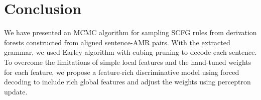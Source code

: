 \section{Conclusion}
We have presented an MCMC algorithm for sampling SCFG rules from derivation forests constructed from aligned sentence-AMR pairs.
With the extracted grammar, we used Earley algorithm with cubing pruning to decode each sentence. To overcome the limitations of
simple local features and the hand-tuned weights for each feature, we propose a feature-rich discriminative model using forced decoding to
include rich global features and adjust the weights using perceptron update.
